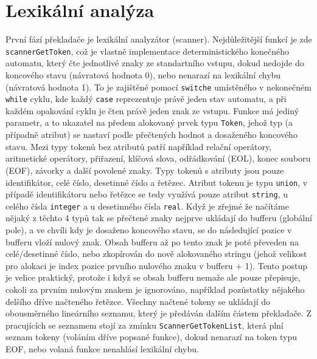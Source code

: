 \documentclass[a4paper, 11pt]{article}
\begin{document}
\newpage
\section{Lexikální analýza}
První fází překladače je lexikální analyzátor (scanner). Nejdůležitější funkcí je zde \verb|scannerGetToken|, což je vlastně implementace deterministického konečného automatu, který čte jednotlivé znaky ze standartního vstupu, dokud nedojde do koncového stavu (návratová hodnota 0), nebo nenarazí na lexikální chybu (návratová hodnota 1). To je zajištěné pomocí \verb|switche| umístěného v nekonečném \verb|while| cyklu, kde každý \verb|case| reprezentuje právě jeden stav automatu, a při každém opakování cyklu je čten právě jeden znak ze vstupu.
\newline
\newline
Funkce má jediný parametr, a to ukazatel na předem alokovaný prvek typu \verb|Token|, jehož typ (a případně atribut) se nastaví podle přečtených hodnot a dosaženého koncového stavu. Mezi typy tokenů bez atributů patří například relační operátory, aritmetické operátory, přiřazení, klíčová slova, odřádkování (EOL), konec souboru (EOF), závorky a další povolené znaky.
\newline
\newline
Typy tokenů s atributy jsou pouze identifikátor, celé číslo, desetinné číslo a řetězec. Atribut tokenu je typu \verb|union|, v případě identifikátoru nebo řetězce se tedy využívá pouze atribut \verb|string|, u celého čísla \verb|integer| a u desetinného čísla \verb|real|. Když je zřejmé že načítáme nějaký z těchto 4 typů tak se přečtené znaky nejprve ukládají do bufferu (globální pole), a ve chvíli kdy je dosaženo koncového stavu, se do následující pozice v bufferu vloží nulový znak. Obsah bufferu až po tento znak je poté převeden na celé/desetinné číslo, nebo zkopírován do nově alokovaného stringu (jehož velikost pro alokaci je index pozice prvního nulového znaku v bufferu + 1). Tento postup je velice praktický, protože i když se obsah bufferu nemaže ale pouze přepisuje, cokoli za prvním nulovým znakem je ignorováno, například pozůstatky nějakého delšího dříve načteného řetězce.
\newline
\newline
Všechny načtené tokeny se ukládají do obousměrného lineárního seznamu, který je předáván dalším částem překladače. Z pracujících se seznamem stojí za zmínku \verb|ScannerGetTokenList|, která plní seznam tokeny (voláním dříve popsané funkce), dokud nenarazí na token typu EOF, nebo volaná funkce nenahlásí lexikální chybu.
\end{document}
